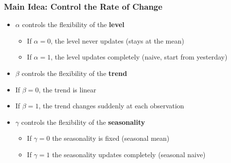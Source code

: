 \documentclass{beamer}
\begin{document}
\begin{frame}
  \frametitle{Main Idea: Control the Rate of Change}

  \begin{itemize}
  \item $\alpha$ controls the flexibility of the \textbf{level}
    \begin{itemize}
    \item If $\alpha = 0$, the level never updates (stays at the mean)
    \item If $\alpha = 1$, the level updates completely (naive, start from yesterday)
    \end{itemize}
  \item $\beta$ controls the flexibility of the \textbf{trend}
    \item If $\beta = 0$, the trend is linear
    \item If $\beta = 1$, the trend changes suddenly at each observation
    
    \item $\gamma$ controls the flexibility of the \textbf{seasonality}
      \begin{itemize}
      \item If $\gamma = 0$ the seasonality is fixed (seasonal mean)
      \item If $\gamma = 1$ the seasonality updates completely (seasonal naive)        
      \end{itemize}
  \end{itemize}
  
\end{frame}
\end{document}
